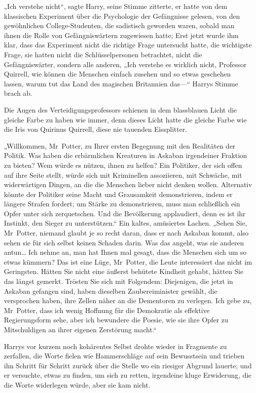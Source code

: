 {„Ich verstehe nicht“, sagte Harry, seine Stimme zitterte, er hatte von dem klassischen Experiment über die Psychologie der Gefängnisse gelesen, von den gewöhnlichen College-Studenten, die sadistisch geworden waren, sobald man ihnen die Rolle von Gefängniswärtern zugewiesen hatte; Erst jetzt wurde ihm klar, dass das Experiment nicht die richtige Frage untersucht hatte, die wichtigste Frage, sie hatten nicht die Schlüsselpersonen betrachtet, nicht die Gefängniswärter, sondern alle anderen, „Ich verstehe es wirklich nicht, Professor Quirrell, wie können die Menschen einfach zusehen und so etwas geschehen lassen, warum tut das Land des magischen Britannien das—“ Harrys Stimme brach ab.

Die Augen des Verteidigungsprofessors schienen in dem blassblauen Licht die gleiche Farbe zu haben wie immer, denn dieses Licht hatte die gleiche Farbe wie die Iris von Quirinus Quirrell, diese nie tauenden Eissplitter.

„Willkommen, Mr~Potter, zu Ihrer ersten Begegnung mit den Realitäten der Politik. Was haben die erbärmlichen Kreaturen in Askaban irgendeiner Fraktion zu bieten? Wem würde es nützen, ihnen zu helfen? Ein Politiker, der sich offen auf ihre Seite stellt, würde sich mit Kriminellen assoziieren, mit Schwäche, mit widerwärtigen Dingen, an die die Menschen lieber nicht denken wollen. Alternativ könnte der Politiker seine Macht und Grausamkeit demonstrieren, indem er längere Strafen fordert; um Stärke zu demonstrieren, muss man schließlich ein Opfer unter sich zerquetschen. Und die Bevölkerung applaudiert, denn es ist ihr Instinkt, den Sieger zu unterstützen.“ Ein kaltes, amüsiertes Lachen. „Sehen Sie, Mr~Potter, niemand glaubt je so recht daran, dass er nach Askaban kommt, also sehen sie für sich selbst keinen Schaden darin. Was das angeht, was sie anderen antun… Ich nehme an, man hat Ihnen mal gesagt, dass die Menschen sich um so etwas kümmern? Das ist eine Lüge, Mr~Potter, die Leute interessiert das nicht im Geringsten. Hätten Sie nicht eine äußerst behütete Kindheit gehabt, hätten Sie das längst gemerkt. Trösten Sie sich mit Folgendem: Diejenigen, die jetzt in Askaban gefangen sind, haben dieselben Zaubereiminister gewählt, die versprochen haben, ihre Zellen näher an die Dementoren zu verlegen. Ich gebe zu, Mr~Potter, dass ich wenig Hoffnung für die Demokratie als effektive Regierungsform sehe, aber ich bewundere die Poesie, wie sie ihre Opfer zu Mitschuldigen an ihrer eigenen Zerstörung macht.“

Harrys vor kurzem noch kohärentes Selbst drohte wieder in Fragmente zu zerfallen, die Worte fielen wie Hammerschläge auf sein Bewusstsein und trieben ihn Schritt für Schritt zurück über die Stelle wo ein riesiger Abgrund lauerte; und er versuchte, etwas zu finden, um sich zu retten, irgendeine kluge Erwiderung, die die Worte widerlegen würde, aber sie kam nicht.

}
